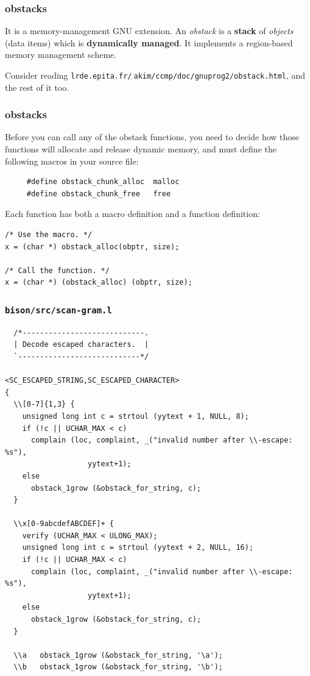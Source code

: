 \documentclass{beamer}
\begin{document}
\begin{frame}
  \frametitle{obstacks}
It is a memory-management GNU extension. An \textit{obstack} is a
\textbf{stack} of \textit{objects} (data items) which is \textbf{dynamically
managed}. It implements a region-based memory management scheme.

\vfill

Consider reading
\texttt{lrde.epita.fr/$_{\widetilde{~}}$akim/ccmp/doc/gnuprog2/obstack.html}, and
the rest of it too.
\end{frame}

\begin{frame}[fragile]
  \frametitle{obstacks}

Before you can call any of the obstack functions, you need to decide how those
functions will allocate and release dynamic memory, and must define the
following macros in your source file:

\begin{verbatim}
     #define obstack_chunk_alloc  malloc
     #define obstack_chunk_free   free
\end{verbatim}

\vfill

Each function has both a macro definition and a function definition:

\begin{verbatim}
/* Use the macro. */
x = (char *) obstack_alloc(obptr, size);

/* Call the function. */
x = (char *) (obstack_alloc) (obptr, size);
\end{verbatim}
\end{frame}

\begin{frame}[fragile,shrink=25]
  \frametitle{\texttt{bison/src/scan-gram.l}}
\begin{verbatim}
  /*----------------------------.
  | Decode escaped characters.  |
  `----------------------------*/

<SC_ESCAPED_STRING,SC_ESCAPED_CHARACTER>
{
  \\[0-7]{1,3} {
    unsigned long int c = strtoul (yytext + 1, NULL, 8);
    if (!c || UCHAR_MAX < c)
      complain (loc, complaint, _("invalid number after \\-escape: %s"),
                   yytext+1);
    else
      obstack_1grow (&obstack_for_string, c);
  }

  \\x[0-9abcdefABCDEF]+ {
    verify (UCHAR_MAX < ULONG_MAX);
    unsigned long int c = strtoul (yytext + 2, NULL, 16);
    if (!c || UCHAR_MAX < c)
      complain (loc, complaint, _("invalid number after \\-escape: %s"),
                   yytext+1);
    else
      obstack_1grow (&obstack_for_string, c);
  }

  \\a   obstack_1grow (&obstack_for_string, '\a');
  \\b   obstack_1grow (&obstack_for_string, '\b');
\end{verbatim}
\end{frame}
\end{document}
